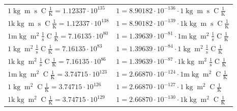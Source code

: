 \begin{center}
\begin{longtable}{l l}
{\color{black}$1 \bm{\mathrm{ }}\operatorname{kg}{\operatorname{m}}{\operatorname{s}}{\operatorname{C}}\frac1{\operatorname{K}} = 1.12337\cdot10^{135} $}   & {\color{black}$ 1 = 8.90182\cdot10^{-136} \cdot 1 \bm{\mathrm{ }}\operatorname{kg}{\operatorname{m}}{\operatorname{s}}{\operatorname{C}}\frac1{\operatorname{K}}$}  \\
{\color{gray}$1 \bm{\mathrm{ k}}\operatorname{kg}{\operatorname{m}}{\operatorname{s}}{\operatorname{C}}\frac1{\operatorname{K}} = 1.12337\cdot10^{138} $}   & {\color{gray}$ 1 = 8.90182\cdot10^{-139} \cdot 1 \bm{\mathrm{ k}}\operatorname{kg}{\operatorname{m}}{\operatorname{s}}{\operatorname{C}}\frac1{\operatorname{K}}$}  \\
{\color{gray}$1 \bm{\mathrm{ m}}\operatorname{kg}{\operatorname{m}^2}\frac1{\operatorname{s}}{\operatorname{C}}\frac1{\operatorname{K}} = 7.16135\cdot10^{80} $}   & {\color{gray}$ 1 = 1.39639\cdot10^{-81} \cdot 1 \bm{\mathrm{ m}}\operatorname{kg}{\operatorname{m}^2}\frac1{\operatorname{s}}{\operatorname{C}}\frac1{\operatorname{K}}$}  \\
{\color{black}$1 \bm{\mathrm{ }}\operatorname{kg}{\operatorname{m}^2}\frac1{\operatorname{s}}{\operatorname{C}}\frac1{\operatorname{K}} = 7.16135\cdot10^{83} $}   & {\color{black}$ 1 = 1.39639\cdot10^{-84} \cdot 1 \bm{\mathrm{ }}\operatorname{kg}{\operatorname{m}^2}\frac1{\operatorname{s}}{\operatorname{C}}\frac1{\operatorname{K}}$}  \\
{\color{gray}$1 \bm{\mathrm{ k}}\operatorname{kg}{\operatorname{m}^2}\frac1{\operatorname{s}}{\operatorname{C}}\frac1{\operatorname{K}} = 7.16135\cdot10^{86} $}   & {\color{gray}$ 1 = 1.39639\cdot10^{-87} \cdot 1 \bm{\mathrm{ k}}\operatorname{kg}{\operatorname{m}^2}\frac1{\operatorname{s}}{\operatorname{C}}\frac1{\operatorname{K}}$}  \\
{\color{gray}$1 \bm{\mathrm{ m}}\operatorname{kg}{\operatorname{m}^2}{}{\operatorname{C}}\frac1{\operatorname{K}} = 3.74715\cdot10^{123} $}   & {\color{gray}$ 1 = 2.66870\cdot10^{-124} \cdot 1 \bm{\mathrm{ m}}\operatorname{kg}{\operatorname{m}^2}{}{\operatorname{C}}\frac1{\operatorname{K}}$}  \\
{\color{black}$1 \bm{\mathrm{ }}\operatorname{kg}{\operatorname{m}^2}{}{\operatorname{C}}\frac1{\operatorname{K}} = 3.74715\cdot10^{126} $}   & {\color{black}$ 1 = 2.66870\cdot10^{-127} \cdot 1 \bm{\mathrm{ }}\operatorname{kg}{\operatorname{m}^2}{}{\operatorname{C}}\frac1{\operatorname{K}}$}  \\
{\color{gray}$1 \bm{\mathrm{ k}}\operatorname{kg}{\operatorname{m}^2}{}{\operatorname{C}}\frac1{\operatorname{K}} = 3.74715\cdot10^{129} $}   & {\color{gray}$ 1 = 2.66870\cdot10^{-130} \cdot 1 \bm{\mathrm{ k}}\operatorname{kg}{\operatorname{m}^2}{}{\operatorname{C}}\frac1{\operatorname{K}}$}  \\

\end{longtable}
\end{center}
